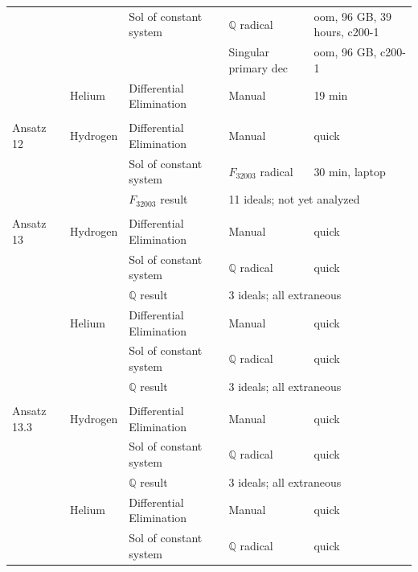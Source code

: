 \documentclass{article}
\def\R32003{$F_{32003}$}
\begin{document}
\begin{longtable}{lllll}
           &               &Sol of constant system   &$\mathbb{Q}$ radical  &oom, 96 GB, 39 hours, c200-1\\
           &               &                         &Singular primary dec  &oom, 96 GB, c200-1\\
           &Helium         &Differential Elimination &Manual                &19 min\\
           &               &                         &                      &\\
Ansatz 12  &Hydrogen       &Differential Elimination &Manual                &quick\\
           &               &Sol of constant system   &\R32003 radical       &30 min, laptop\\
           &               &\R32003 result            &\multicolumn{2}{l}{11 ideals; not yet analyzed}\\
           &               &                         &                      &\\
Ansatz 13  &Hydrogen       &Differential Elimination &Manual                &quick\\
           &               &Sol of constant system   &$\mathbb{Q}$ radical             &quick\\
           &               &$\mathbb{Q}$ result                 &\multicolumn{2}{l}{3 ideals; all extraneous}\\
           &Helium         &Differential Elimination &Manual                &quick\\
           &               &Sol of constant system   &$\mathbb{Q}$ radical             &quick\\
           &               &$\mathbb{Q}$ result                 &\multicolumn{2}{l}{3 ideals; all extraneous}\\
           &               &                         &                      &\\
Ansatz 13.3&Hydrogen       &Differential Elimination &Manual                &quick\\
           &               &Sol of constant system   &$\mathbb{Q}$ radical             &quick\\
           &               &$\mathbb{Q}$ result                 &\multicolumn{2}{l}{3 ideals; all extraneous}\\
           &Helium         &Differential Elimination &Manual                &quick\\
           &               &Sol of constant system   &$\mathbb{Q}$ radical             &quick\\

\end{longtable}
\end{document}
